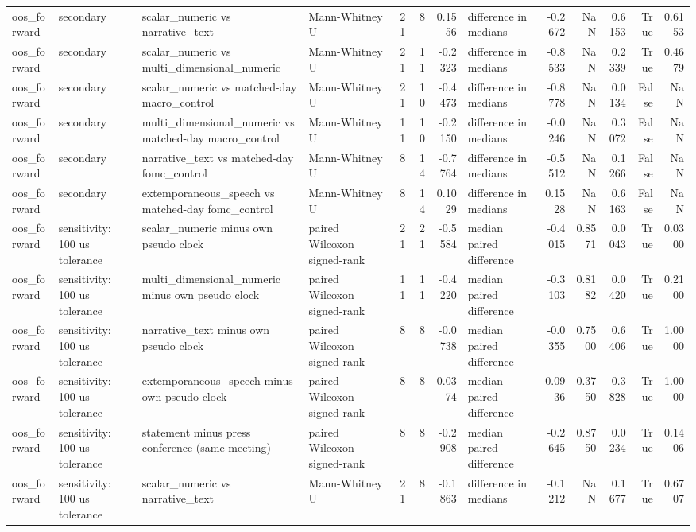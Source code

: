 \begin{tabular}{llllrrrlrrrrr}
oos_forward & secondary & scalar_numeric vs narrative_text & Mann-Whitney U & 21 & 8 & 0.1556 & difference in medians & -0.2672 & NaN & 0.6153 & True & 0.6153 \\
oos_forward & secondary & scalar_numeric vs multi_dimensional_numeric & Mann-Whitney U & 21 & 11 & -0.2323 & difference in medians & -0.8533 & NaN & 0.2339 & True & 0.4679 \\
oos_forward & secondary & scalar_numeric vs matched-day macro_control & Mann-Whitney U & 21 & 10 & -0.4473 & difference in medians & -0.8778 & NaN & 0.0134 & False & NaN \\
oos_forward & secondary & multi_dimensional_numeric vs matched-day macro_control & Mann-Whitney U & 11 & 10 & -0.2150 & difference in medians & -0.0246 & NaN & 0.3072 & False & NaN \\
oos_forward & secondary & narrative_text vs matched-day fomc_control & Mann-Whitney U & 8 & 14 & -0.7764 & difference in medians & -0.5512 & NaN & 0.1266 & False & NaN \\
oos_forward & secondary & extemporaneous_speech vs matched-day fomc_control & Mann-Whitney U & 8 & 14 & 0.1029 & difference in medians & 0.1528 & NaN & 0.6163 & False & NaN \\
oos_forward & sensitivity: 100 us tolerance & scalar_numeric minus own pseudo clock & paired Wilcoxon signed-rank & 21 & 21 & -0.5584 & median paired difference & -0.4015 & 0.8571 & 0.0043 & True & 0.0300 \\
oos_forward & sensitivity: 100 us tolerance & multi_dimensional_numeric minus own pseudo clock & paired Wilcoxon signed-rank & 11 & 11 & -0.4220 & median paired difference & -0.3103 & 0.8182 & 0.0420 & True & 0.2100 \\
oos_forward & sensitivity: 100 us tolerance & narrative_text minus own pseudo clock & paired Wilcoxon signed-rank & 8 & 8 & -0.0738 & median paired difference & -0.0355 & 0.7500 & 0.6406 & True & 1.0000 \\
oos_forward & sensitivity: 100 us tolerance & extemporaneous_speech minus own pseudo clock & paired Wilcoxon signed-rank & 8 & 8 & 0.0374 & median paired difference & 0.0936 & 0.3750 & 0.3828 & True & 1.0000 \\
oos_forward & sensitivity: 100 us tolerance & statement minus press conference (same meeting) & paired Wilcoxon signed-rank & 8 & 8 & -0.2908 & median paired difference & -0.2645 & 0.8750 & 0.0234 & True & 0.1406 \\
oos_forward & sensitivity: 100 us tolerance & scalar_numeric vs narrative_text & Mann-Whitney U & 21 & 8 & -0.1863 & difference in medians & -0.1212 & NaN & 0.1677 & True & 0.6707 \\

\end{tabular}
